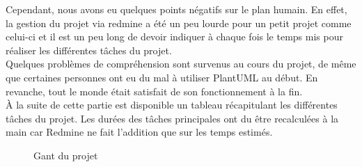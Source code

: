 Cependant, nous avons eu quelques points négatifs sur le plan humain. En effet, la gestion du projet via redmine a été un peu lourde pour un petit projet comme celui-ci et il est un peu long de devoir indiquer à chaque fois le temps mis pour réaliser les différentes tâches du projet. \\

Quelques problèmes de compréhension sont survenus au cours du projet, de même que certaines personnes ont eu du mal à utiliser PlantUML au début. En revanche, tout le monde était satisfait de son fonctionnement à la fin.\\

À la suite de cette partie est disponible un tableau récapitulant les différentes tâches du projet. Les durées des tâches principales ont du être recalculées à la main car Redmine ne fait l'addition que sur les temps estimés. 




\begin{figure}[H]
\noindent{}
\caption{Gant du projet}
\end{figure}



\restoregeometry